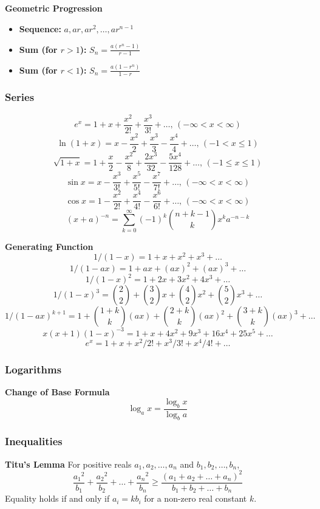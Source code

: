 \textbf{Geometric Progression}
\begin{itemize}
  \item \textbf{Sequence:} $a, ar, ar^2, \dots, ar^{n-1}$
  \item \textbf{Sum (for $r > 1$):} $S_n = \frac{a(r^n - 1)}{r-1}$
  \item \textbf{Sum (for $r < 1$):} $S_n = \frac{a(1 - r^n)}{1-r}$
\end{itemize}

\subsubsection{Series}
$$e^x = 1+x+\frac{x^2}{2!}+\frac{x^3}{3!}+\dots,\,(-\infty<x<\infty)$$
$$\ln(1+x) = x-\frac{x^2}{2}+\frac{x^3}{3}-\frac{x^4}{4}+\dots,\,(-1<x\le1)$$
$$\sqrt{1+x} = 1+\frac{x}{2}-\frac{x^2}{8}+\frac{2x^3}{32}-\frac{5x^4}{128}+\dots,\,(-1\le x\le1)$$
$$\sin x = x-\frac{x^3}{3!}+\frac{x^5}{5!}-\frac{x^7}{7!}+\dots,\,(-\infty<x<\infty)$$
$$\cos x = 1-\frac{x^2}{2!}+\frac{x^4}{4!}-\frac{x^6}{6!}+\dots,\,(-\infty<x<\infty)$$
$$(x + a)^{-n} = \sum\limits_{k=0}^{\infty} (-1)^{k} \binom{n + k - 1}{k} x^{k}a^{-n-k}$$

\textbf{Generating Function}
$$ 1/(1 - x) = 1 + x + x^2 + x^3 + \dots $$
$$ 1/(1 - ax) = 1 + ax + (ax)^2 + (ax)^3 + \dots $$
$$ 1/(1 - x)^2 = 1 + 2x + 3x^2 + 4x^3 + \dots $$
$$ 1/(1 - x)^3 = \binom{2}{2} + \binom{3}{2}x + \binom{4}{2}x^2 + \binom{5}{2}x^3 + \dots $$
$$ 1/(1 - ax)^{k + 1} = 1 + \binom{1 + k}{k}(ax) + \binom{2 + k}{k}(ax)^2 + \binom{3 + k}{k}(ax)^3 + \dots $$
$$ x(x + 1)(1 - x)^{-3} = 1 + x + 4x^2 + 9x^3 + 16x^4 + 25x^5 + \dots $$
$$ e^x = 1 + x + x^2/2! + x^3/3! + x^4/4! + \dots $$

\subsubsection{Logarithms}
\textbf{Change of Base Formula}
$$
\log_a x = \frac{\log_b x}{\log_b a}
$$

\subsubsection{Inequalities}
\textbf{Titu's Lemma}
For positive reals $a_1, a_2, \ldots, a_n$ and $b_1, b_2, \ldots, b_n$,
$$\frac{{a_1}^2}{b_1} + \frac{{a_2}^2}{b_2} + \dots + \frac{{a_n}^2}{b_n} \ge \frac{(a_1 + a_2 + \dots + a_n)^2}{b_1 + b_2 + \dots + b_n}$$
Equality holds if and only if $ a_i = kb_i$ for a non-zero real constant $k$.

